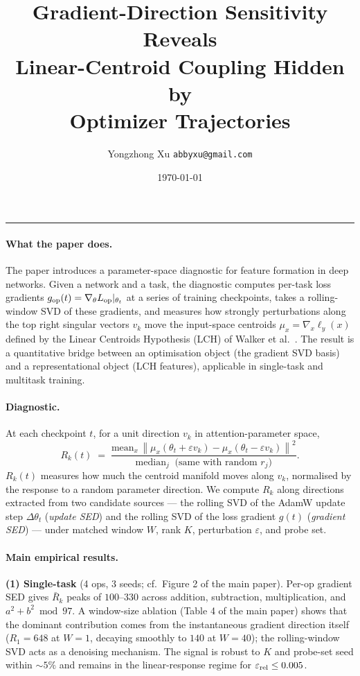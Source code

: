 \documentclass[11pt]{article}
\title{\large\textbf{Gradient-Direction Sensitivity Reveals\\
       Linear-Centroid Coupling Hidden by\\
       Optimizer Trajectories}}
\author{Yongzhong Xu \quad\small\texttt{abbyxu@gmail.com}}
\date{\small\today}
\newcommand{\norm}[1]{\left\|#1\right\|}
\newcommand{\eps}{\varepsilon}
\begin{document}
\maketitle
\vspace{-1.5em}

\noindent\rule{\linewidth}{0.4pt}

\paragraph{What the paper does.}
The paper introduces a parameter-space diagnostic for feature
formation in deep networks. Given a network and a task, the
diagnostic computes per-task loss gradients
$g_{\rm op}(t) = \nabla_\theta L_{\rm op}|_{\theta_t}$ at a series
of training checkpoints, takes a rolling-window SVD of these
gradients, and measures how strongly perturbations along the top
right singular vectors $v_k$ move the input-space centroids
$\mu_x = \nabla_x \ell_y(x)$ defined by the Linear Centroids
Hypothesis (LCH) of Walker et al.\ \cite{lch_short}. The result is
a quantitative bridge between an optimisation object (the
gradient SVD basis) and a representational object (LCH features),
applicable in single-task and multitask training.

\paragraph{Diagnostic.}
At each checkpoint $t$, for a unit direction $v_k$ in
attention-parameter space,
\[
  R_k(t) \;=\;
  \frac{\mathrm{mean}_x \, \norm{ \mu_x(\theta_t + \eps v_k)
                            - \mu_x(\theta_t - \eps v_k) }^2}
       {\mathrm{median}_j \;\;\text{(same with random } r_j\text{)}}.
\]
$R_k(t)$ measures how much the centroid manifold moves along
$v_k$, normalised by the response to a random parameter
direction. We compute $R_k$ along directions extracted from two
candidate sources --- the rolling SVD of the AdamW update step
$\Delta\theta_t$ (\emph{update SED}) and the rolling SVD of the
loss gradient $g(t)$ (\emph{gradient SED}) --- under matched window
$W$, rank $K$, perturbation $\eps$, and probe set.

\paragraph{Main empirical results.}

\textbf{(1) Single-task} (4 ops, 3 seeds; cf.\ Figure 2 of the
main paper). Per-op gradient SED gives $\bar R_k$ peaks of
$100$--$330$ across addition, subtraction, multiplication, and
$a^2{+}b^2 \bmod 97$. A window-size ablation
(Table 4 of the main paper) shows that the dominant contribution
comes from the instantaneous gradient direction itself
($R_1 = 648$ at $W{=}1$, decaying smoothly to $140$ at $W{=}40$);
the rolling-window SVD acts as a denoising mechanism. The signal
is robust to $K$ and probe-set seed within $\sim 5\%$ and remains
in the linear-response regime for $\eps_{\rm rel} \le 0.005$.
\end{document}
